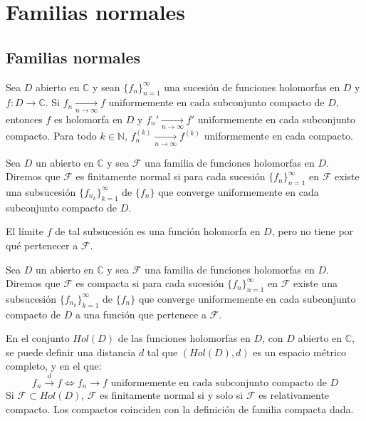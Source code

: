 \chapter{Familias normales}
\section{Familias normales}

\begin{theorem}
    Sea $D$ abierto en $\mathbb{C}$ y sean $\{f_n\}_{n=1}^\infty$ una sucesión de funciones holomorfas en $D$ y $f: D \to \mathbb{C}$.
    Si $f_n \xrightarrow[n \to \infty]{} f$ uniformemente en cada subconjunto compacto de $D$, entonces $f$ es holomorfa en $D$ y $f_n' \xrightarrow[n \to \infty]{} f'$ uniformemente en cada subconjunto compacto.
    Para todo $k \in \mathbb{N}$, $f^{(k)}_n \xrightarrow[n \to \infty]{} f^{(k)}$ uniformemente en cada compacto.
\end{theorem}

\begin{definition}
    Sea $D$ un abierto en $\mathbb{C}$ y sea $\mathcal{F}$ una familia de funciones holomorfas en $D$.
    Diremos que $\mathcal{F}$ es finitamente normal si para cada sucesión $\{f_n\}_{n=1}^\infty$ en $\mathcal{F}$ existe una subsucesión $\{f_{n_k}\}_{k=1}^\infty$ de $\{f_n\}$ que converge uniformemente en cada subconjunto compacto de $D$.
\end{definition}

\begin{remark}
    El límite $f$ de tal subsucesión es una función holomorfa en $D$, pero no tiene por qué pertenecer a $\mathcal{F}$.
\end{remark}

\begin{definition}
    Sea $D$ un abierto en $\mathbb{C}$ y sea $\mathcal{F}$ una familia de funciones holomorfas en $D$.
    Diremos que $\mathcal{F}$ es compacta si para cada sucesión $\{f_n\}_{n=1}^\infty$ en $\mathcal{F}$ existe una subsucesión $\{f_{n_k}\}_{k=1}^\infty$ de $\{f_n\}$ que converge uniformemente en cada subconjunto compacto de $D$ a una función que pertenece a $\mathcal{F}$.
\end{definition}

En el conjunto $Hol(D)$ de las funciones holomorfas en $D$, con $D$ abierto en $\mathbb{C}$, se puede definir una distancia $d$ tal que $(Hol(D), d)$ es un espacio métrico completo, y en el que:
$$f_n \xrightarrow{d} f \Leftrightarrow f_n \to f \text{ uniformemente en cada subconjunto compacto de } D$$
Si $\mathcal{F} \subset Hol(D)$, $\mathcal{F}$ es finitamente normal si y solo si $\mathcal{F}$ es relativamente compacto.
Los compactos coinciden con la definición de familia compacta dada.

